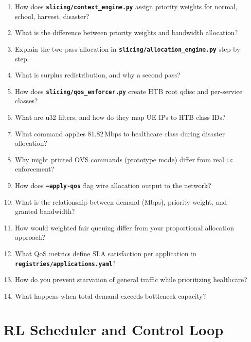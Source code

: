 \documentclass[11pt,a4paper]{article}
\newcommand{\proj}[1]{\textbf{\texttt{#1}}}
\begin{document}
\begin{enumerate}
    \item How does \proj{slicing/context\_engine.py} assign priority weights for normal, school, harvest, disaster?
    \item What is the difference between priority weights and bandwidth allocation?
    \item Explain the two-pass allocation in \proj{slicing/allocation\_engine.py} step by step.
    \item What is surplus redistribution, and why a second pass?
    \item How does \proj{slicing/qos\_enforcer.py} create HTB root qdisc and per-service classes?
    \item What are u32 filters, and how do they map UE IPs to HTB class IDs?
    \item What command applies 81.82\,Mbps to healthcare class during disaster allocation?
    \item Why might printed OVS commands (prototype mode) differ from real \texttt{tc} enforcement?
    \item How does \proj{--apply-qos} flag wire allocation output to the network?
    \item What is the relationship between demand (Mbps), priority weight, and granted bandwidth?
    \item How would weighted fair queuing differ from your proportional allocation approach?
    \item What QoS metrics define SLA satisfaction per application in \proj{registries/applications.yaml}?
    \item How do you prevent starvation of general traffic while prioritizing healthcare?
    \item What happens when total demand exceeds bottleneck capacity?
\end{enumerate}

\section{RL Scheduler and Control Loop}
\end{document}
